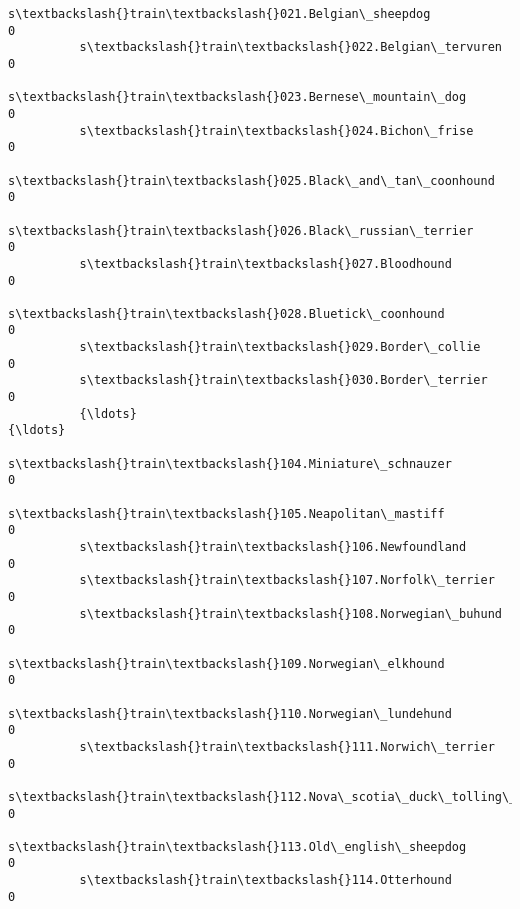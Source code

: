 \documentclass[11pt]{article}
\begin{document}
\begin{Verbatim}[commandchars=\\\{\}]
          s\textbackslash{}train\textbackslash{}021.Belgian\_sheepdog                                                  0   
          s\textbackslash{}train\textbackslash{}022.Belgian\_tervuren                                                  0   
          s\textbackslash{}train\textbackslash{}023.Bernese\_mountain\_dog                                              0   
          s\textbackslash{}train\textbackslash{}024.Bichon\_frise                                                      0   
          s\textbackslash{}train\textbackslash{}025.Black\_and\_tan\_coonhound                                           0   
          s\textbackslash{}train\textbackslash{}026.Black\_russian\_terrier                                             0   
          s\textbackslash{}train\textbackslash{}027.Bloodhound                                                        0   
          s\textbackslash{}train\textbackslash{}028.Bluetick\_coonhound                                                0   
          s\textbackslash{}train\textbackslash{}029.Border\_collie                                                     0   
          s\textbackslash{}train\textbackslash{}030.Border\_terrier                                                    0   
          {\ldots}                                                                         {\ldots}   
          s\textbackslash{}train\textbackslash{}104.Miniature\_schnauzer                                               0   
          s\textbackslash{}train\textbackslash{}105.Neapolitan\_mastiff                                                0   
          s\textbackslash{}train\textbackslash{}106.Newfoundland                                                      0   
          s\textbackslash{}train\textbackslash{}107.Norfolk\_terrier                                                   0   
          s\textbackslash{}train\textbackslash{}108.Norwegian\_buhund                                                  0   
          s\textbackslash{}train\textbackslash{}109.Norwegian\_elkhound                                                0   
          s\textbackslash{}train\textbackslash{}110.Norwegian\_lundehund                                               0   
          s\textbackslash{}train\textbackslash{}111.Norwich\_terrier                                                   0   
          s\textbackslash{}train\textbackslash{}112.Nova\_scotia\_duck\_tolling\_retriever                                0   
          s\textbackslash{}train\textbackslash{}113.Old\_english\_sheepdog                                              0   
          s\textbackslash{}train\textbackslash{}114.Otterhound                                                        0   

\end{Verbatim}
\end{document}
